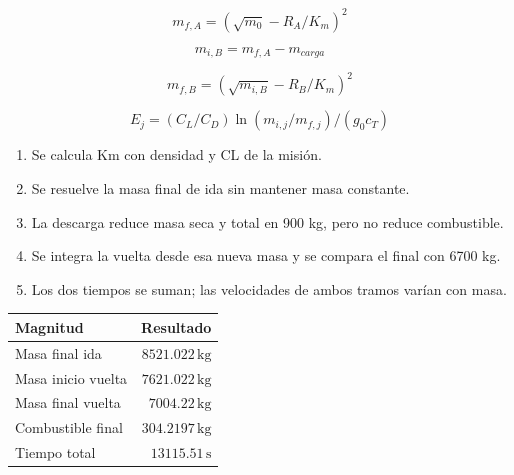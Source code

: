 \begin{equation}m_{f,A}=(\sqrt{m_0}-R_A/K_m)^2\end{equation}

\begin{equation}m_{i,B}=m_{f,A}-m_{carga}\end{equation}

\begin{equation}m_{f,B}=(\sqrt{m_{i,B}}-R_B/K_m)^2\end{equation}

\begin{equation}E_j=(C_L/C_D)\ln(m_{i,j}/m_{f,j})/(g_0c_T)\end{equation}


\begin{enumerate}

\item Se calcula Km con densidad y CL de la misión.

\item Se resuelve la masa final de ida sin mantener masa constante.

\item La descarga reduce masa seca y total en 900 kg, pero no reduce combustible.

\item Se integra la vuelta desde esa nueva masa y se compara el final con 6700 kg.

\item Los dos tiempos se suman; las velocidades de ambos tramos varían con masa.

\end{enumerate}





\begin{center}\begin{tabular}{lr}\toprule Magnitud&Resultado\\\midrule

Masa final ida & $8521.022\,\mathrm{kg}$\\

Masa inicio vuelta & $7621.022\,\mathrm{kg}$\\

Masa final vuelta & $7004.22\,\mathrm{kg}$\\

Combustible final & $304.2197\,\mathrm{kg}$\\

Tiempo total & $13115.51\,\mathrm s$\\

\bottomrule\end{tabular}\end{center}

